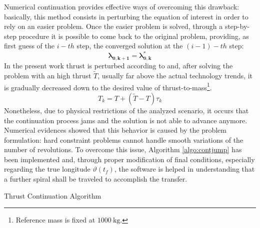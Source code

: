 Numerical continuation provides effective ways of overcoming this drawback: basically, this method consists in perturbing the equation of interest in order to rely on an easier problem. Once the easier problem is solved, through a step-by-step procedure it is possible to come back to the original problem, providing, as first guess of the $i-th$ step, the converged solution at the $(i-1)-th$ step:
%
\begin{equation}
\boldsymbol{\lambda_{0,k+1}} = \boldsymbol{\lambda^*_{0,k}}
\end{equation}
%
In the present work thrust is perturbed according to  and, after solving the problem with an high thrust $\tilde{T}$, usually far above the actual technology trends, it is gradually decreased down to the desired value of thrust-to-mass\footnote{Reference mass is fixed at $1000~\si{\kilo\gram}$.}.
%
\begin{equation}
\label{eq_thrustformula}
T_k = T + (\tilde{T} - T )\tau_k
\end{equation}
%
Nonetheless, due to physical restrictions of the analyzed scenario, it occurs that the continuation process jams and the solution is not able to advance anymore. Numerical evidences showed that this behavior is caused by the problem formulation: hard constraint problems cannot handle smooth variations of the number of revolutions.
To overcome this issue, Algorithm \ref{algo:contjump} has been implemented and, through proper modification of final conditions, especially regarding the true longitude $\vartheta(t_f)$, the software is helped in understanding that a further spiral shall be traveled to accomplish the transfer.

\begin{algorithm}
\caption{Thrust Continuation Algorithm}\label{algo:contjump}
\begin{algorithmic}[1]
\ELSE
{}
\ENDIF
\ELSE
{}
\ENDIF
\ENDIF
\ENDWHILE
\end{algorithmic}
\end{algorithm}